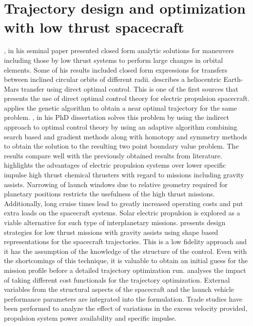 \section{Trajectory design and optimization with low thrust spacecraft}
\cite{edelbaum_propulsion_1961}, in his seminal paper presented closed form analytic solutions for maneuvers including those by low thrust systems to perform large changes in orbital elements. Some of his results included closed form expressions for transfers between inclined circular orbits of different radii. \cite{arthur._e_applied_1975} describes a heliocentric Earth-Mars transfer using direct optimal control. This is one of the first sources that presents the use of direct optimal control theory for electric propulsion spacecraft. \cite{rauwolf_near-optimal_1996} applies the genetic algorithm to obtain a near optimal trajectory for the same problem. \cite{kim_continuous_2005}, in his PhD dissertation solves this problem by using the indirect approach to optimal control theory by using an adaptive algorithm combining search based and gradient methods along with homotopy and symmetry methods to obtain the solution to the resulting two point boundary value problem. The results compare well with the previously obtained results from literature.\\
\cite{racca_capability_2001} highlights the advantages of electric propulsion systems over lower specific impulse high thrust chemical thrusters with regard to missions including gravity assists. Narrowing of launch windows due to relative geometry required for planetary positions restricts the usefulness of the high thrust missions. Additionally, long cruise times lead to greatly increased operating costs and put extra loads on the spacecraft systems. Solar electric propulsion is explored as a viable alternative for such type of interplanetary missions. \cite{yam_preliminary_2004} presents design strategies for low thrust missions with gravity assists using shape based representations for the spacecraft trajectories. This is a low fidelity approach and it has the assumption of the knowledge of the structure of the control. Even with the shortcomings of this technique, it is valuable to obtain an initial guess for the mission profile before a detailed trajectory optimization run. \cite{patel_maximizing_2006} analyses the impact of taking different cost functionals for the trajectory optimization. External variables from the structural aspects of the spacecraft and the launch vehicle performance parameters are integrated into the formulation. Trade studies have been performed to analyze the effect of variations in the excess velocity provided, propulsion system power availability and specific impulse.\\
